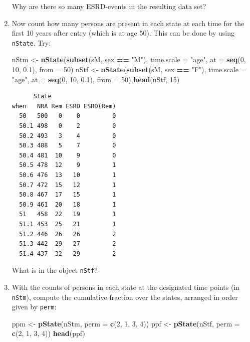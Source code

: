 \documentclass[
]{book}
\newenvironment{Shaded}{\begin{snugshade}}{\end{snugshade}}
\newcommand{\AttributeTok}[1]{\textcolor[rgb]{0.13,0.29,0.53}{#1}}
\newcommand{\DecValTok}[1]{\textcolor[rgb]{0.00,0.00,0.81}{#1}}
\newcommand{\FloatTok}[1]{\textcolor[rgb]{0.00,0.00,0.81}{#1}}
\newcommand{\FunctionTok}[1]{\textcolor[rgb]{0.13,0.29,0.53}{\textbf{#1}}}
\newcommand{\NormalTok}[1]{#1}
\newcommand{\OtherTok}[1]{\textcolor[rgb]{0.56,0.35,0.01}{#1}}
\newcommand{\SpecialCharTok}[1]{\textcolor[rgb]{0.81,0.36,0.00}{\textbf{#1}}}
\newcommand{\StringTok}[1]{\textcolor[rgb]{0.31,0.60,0.02}{#1}}
\begin{document}
\begin{enumerate}
  Why are there so many ESRD-events in the resulting data set?
\item
  Now count how many persons are present in each state
  at each time for the first 10 years after entry (which is at age 50). This
  can be done by using \texttt{nState}. Try:

\begin{Shaded}
\begin{Highlighting}[]
\NormalTok{nStm }\OtherTok{\textless{}{-}} \FunctionTok{nState}\NormalTok{(}\FunctionTok{subset}\NormalTok{(sM, sex }\SpecialCharTok{==} \StringTok{"M"}\NormalTok{), }\AttributeTok{time.scale =} \StringTok{"age"}\NormalTok{, }
               \AttributeTok{at =} \FunctionTok{seq}\NormalTok{(}\DecValTok{0}\NormalTok{, }\DecValTok{10}\NormalTok{, }\FloatTok{0.1}\NormalTok{), }
             \AttributeTok{from =} \DecValTok{50}\NormalTok{)}
\NormalTok{nStf }\OtherTok{\textless{}{-}} \FunctionTok{nState}\NormalTok{(}\FunctionTok{subset}\NormalTok{(sM, sex }\SpecialCharTok{==} \StringTok{"F"}\NormalTok{), }\AttributeTok{time.scale =} \StringTok{"age"}\NormalTok{, }
               \AttributeTok{at =} \FunctionTok{seq}\NormalTok{(}\DecValTok{0}\NormalTok{, }\DecValTok{10}\NormalTok{, }\FloatTok{0.1}\NormalTok{), }
             \AttributeTok{from =} \DecValTok{50}\NormalTok{)}
\FunctionTok{head}\NormalTok{(nStf, }\DecValTok{15}\NormalTok{)}
\end{Highlighting}
\end{Shaded}

\begin{verbatim}
      State
when   NRA Rem ESRD ESRD(Rem)
  50   500   0    0         0
  50.1 498   0    2         0
  50.2 493   3    4         0
  50.3 488   5    7         0
  50.4 481  10    9         0
  50.5 478  12    9         1
  50.6 476  13   10         1
  50.7 472  15   12         1
  50.8 467  17   15         1
  50.9 461  20   18         1
  51   458  22   19         1
  51.1 453  25   21         1
  51.2 446  26   26         2
  51.3 442  29   27         2
  51.4 437  32   29         2
\end{verbatim}

  What is in the object \texttt{nStf}?
\item
  With the counts of persons in each state at the
  designated time points (in \texttt{nStm}), compute the cumulative
  fraction over the states, arranged in order given by \texttt{perm}:

\begin{Shaded}
\begin{Highlighting}[]
\NormalTok{ppm }\OtherTok{\textless{}{-}} \FunctionTok{pState}\NormalTok{(nStm, }\AttributeTok{perm =} \FunctionTok{c}\NormalTok{(}\DecValTok{2}\NormalTok{, }\DecValTok{1}\NormalTok{, }\DecValTok{3}\NormalTok{, }\DecValTok{4}\NormalTok{))}
\NormalTok{ppf }\OtherTok{\textless{}{-}} \FunctionTok{pState}\NormalTok{(nStf, }\AttributeTok{perm =} \FunctionTok{c}\NormalTok{(}\DecValTok{2}\NormalTok{, }\DecValTok{1}\NormalTok{, }\DecValTok{3}\NormalTok{, }\DecValTok{4}\NormalTok{))}
\FunctionTok{head}\NormalTok{(ppf)}
\end{Highlighting}
\end{Shaded}


\end{enumerate}
\end{document}
